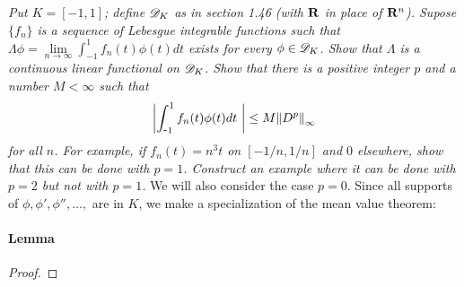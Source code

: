 %
\textit{
Put $K=[-1,1]$; define ${\mathscr D}_{K}$ as in section 1.46 
(with ${\mathbf R}$ in place of ${\mathbf R}^{n}$). 
Supose $\{f_{n}\}$ is a sequence of Lebesgue integrable functions such that 
%
  $\Lambda\phi 
    = 
  \underset{n \to \infty}{\lim} \int_{\minus 1}^1 f_{n}(t)\phi(t)dt$
%
exists for every $\phi\in{\mathscr D}_{K}$. 
Show that $\Lambda$ is a continuous linear functional on ${\mathscr D}_{K}$. 
Show that there is a positive integer $p$ and a number $M<\infty$ such that 
  \begin{align}
    \left\lvert 
      \int_{\text{\small{-}} 1}^1 f_n (t)\phi (t) dt\
    \right\rvert
    \leq 
    M \norm{D^{p}}_{\infty} 
  \nonumber
  \end{align}
for all $n$.
For example, if $f_{n}(t)=n^{3}t$ on $[\minus 1/n, 1/n]$ and $0$ elsewhere, 
show that this can be done with $p=1$. 
Construct an example where it can be done with $p=2$ but not with $p=1$.}
%
%
\renewcommand{\labelenumi}{(\roman{enumi})}%
%
\newline\newline\noindent
We will also consider the case $p=0$. Since all supports of %
%
  $\phi, \phi', \phi'', \dots, $ are in $K$, %
%
we make a specialization of the mean value theorem: %
%
\paragraph{Lemma}\label{2.3 Lemma}
 
%
\begin{proof}
 
 
 
 
\end{proof}
\renewcommand{\labelenumi}{$(\textit{\alph{enumi}})$}%
